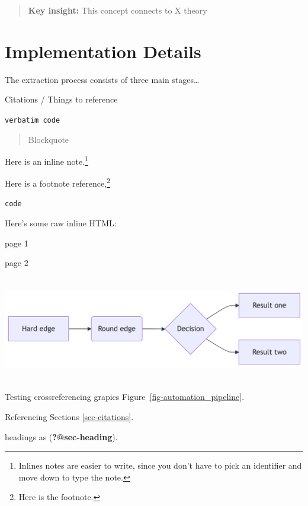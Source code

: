 \documentclass[
  letterpaper,
]{book}
\begin{document}
\begin{quote}
\textbf{Key insight:} This concept connects to X theory
\end{quote}

\section*{Implementation Details}\label{sec-amtair-impl}


The extraction process consists of three main stages\ldots{}

Citations / Things to reference

\texttt{verbatim\ code}

\begin{quote}
Blockquote
\end{quote}

Here is an inline note.\footnote{Inlines notes are easier to write,
  since you don't have to pick an identifier and move down to type the
  note.}

Here is a footnote reference,\footnote{Here is the footnote.}

\begin{verbatim}
code
\end{verbatim}

\renewcommand*{\labelitemi}{\textgreater}

Here's some raw inline HTML:

page 1

\newpage{}

page 2

\includegraphics[width=6.88in,height=1.81in]{chapters/Frontmatter_files/figure-latex/mermaid-figure-2.png}

Testing crossreferencing grapics Figure~\ref{fig-automation_pipeline}.

Referencing Sections \ref{sec-citations}.

headings as (\textbf{?@sec-heading}).
\end{document}
